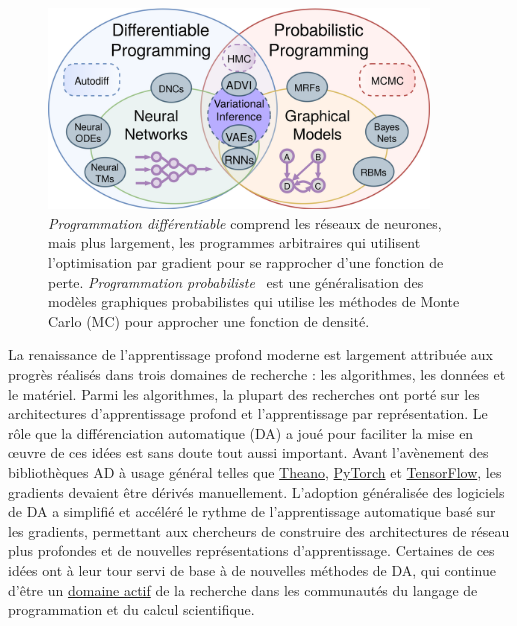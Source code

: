 \begin{figure}
    \centering
    \includegraphics[width=0.90\textwidth]{../figures/diff_prob_prog.png}
    \caption{\textit{Programmation différentiable} comprend les réseaux de neurones, mais plus largement, les programmes arbitraires qui utilisent l'optimisation par gradient pour se rapprocher d'une fonction de perte. \textit{Programmation probabiliste}~\citep{tristan2014augur, carpenter2017stan, gorinova2018slicstan} est une généralisation des modèles graphiques probabilistes qui utilise les méthodes de Monte Carlo (MC) pour approcher une fonction de densité.}
    \label{fig:diff_prob_prog}
\end{figure}

La renaissance de l'apprentissage profond moderne est largement attribuée aux progrès réalisés dans trois domaines de recherche : les algorithmes, les données et le matériel. Parmi les algorithmes, la plupart des recherches ont porté sur les architectures d'apprentissage profond et l'apprentissage par représentation. Le rôle que la différenciation automatique (DA) a joué pour faciliter la mise en œuvre de ces idées est sans doute tout aussi important. Avant l'avènement des bibliothèques AD à usage général telles que \href{http://deeplearning.net/software/theano/}{Theano}, \href{https://pytorch.org/}{PyTorch} et \href{https://tensorflow.org/}{TensorFlow}, les gradients devaient être dérivés manuellement. L'adoption généralisée des logiciels de DA a simplifié et accéléré le rythme de l'apprentissage automatique basé sur les gradients, permettant aux chercheurs de construire des architectures de réseau plus profondes et de nouvelles représentations d'apprentissage. Certaines de ces idées ont à leur tour servi de base à de nouvelles méthodes de DA, qui continue d'être un \href{http://www.autodiff.org}{domaine actif} de la recherche dans les communautés du langage de programmation et du calcul scientifique.

